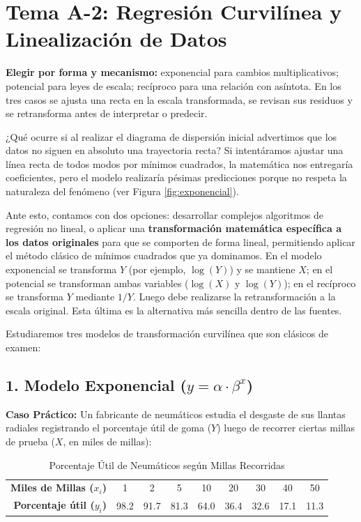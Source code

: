 \documentclass[11pt,a4paper]{article}
\begin{document}
\clearpage
\section{Tema A-2: Regresión Curvilínea y Linealización de Datos}

\begin{ruta}
\textbf{Elegir por forma y mecanismo:} exponencial para cambios multiplicativos; potencial para leyes de escala; recíproco para una relación con asíntota. En los tres casos se ajusta una recta en la escala transformada, se revisan sus residuos y se retransforma antes de interpretar o predecir.
\end{ruta}

¿Qué ocurre si al realizar el diagrama de dispersión inicial advertimos que los datos no siguen en absoluto una trayectoria recta? Si intentáramos ajustar una línea recta de todos modos por mínimos cuadrados, la matemática nos entregaría coeficientes, pero el modelo realizaría pésimas predicciones porque no respeta la naturaleza del fenómeno (ver Figura \ref{fig:exponencial}).

Ante esto, contamos con dos opciones: desarrollar complejos algoritmos de regresión no lineal, o aplicar una \textbf{transformación matemática específica a los datos originales} para que se comporten de forma lineal, permitiendo aplicar el método clásico de mínimos cuadrados que ya dominamos. En el modelo exponencial se transforma $Y$ (por ejemplo, $\log(Y)$) y se mantiene $X$; en el potencial se transforman ambas variables ($\log(X)$ y $\log(Y)$); en el recíproco se transforma $Y$ mediante $1/Y$. Luego debe realizarse la retransformación a la escala original. Esta última es la alternativa más sencilla dentro de las fuentes.

Estudiaremos tres modelos de transformación curvilínea que son clásicos de examen:

\subsection{1. Modelo Exponencial ($y = \alpha \cdot \beta^x$)}
    \textbf{Caso Práctico:} Un fabricante de neumáticos estudia el desgaste de sus llantas radiales registrando el porcentaje útil de goma ($Y$) luego de recorrer ciertas millas de prueba ($X$, en miles de millas):
    \begin{table}[h!]
        \centering
        \caption{Porcentaje Útil de Neumáticos según Millas Recorridas}
        \begin{tabular}{rcccccccc}
            \toprule
            \textbf{Miles de Millas ($x_i$)} & 1 & 2 & 5 & 10 & 20 & 30 & 40 & 50 \\
            \textbf{Porcentaje útil ($y_i$)} & 98.2 & 91.7 & 81.3 & 64.0 & 36.4 & 32.6 & 17.1 & 11.3 \\
            \bottomrule
        \end{tabular}
    \end{table}
\end{document}
